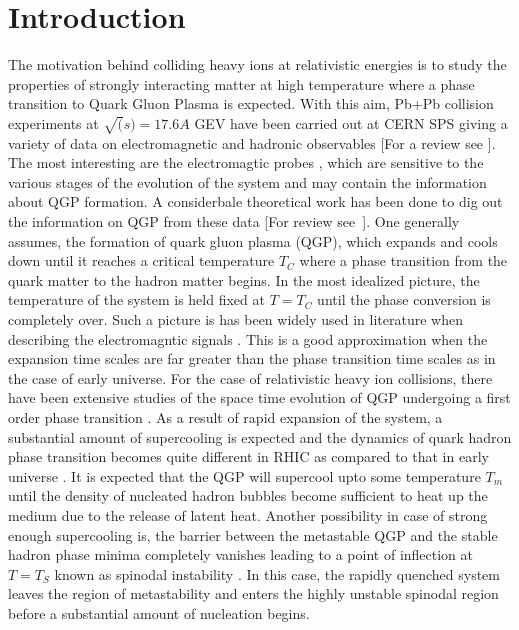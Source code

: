 \section{Introduction} \label{Introduction}
   The motivation behind colliding heavy ions at relativistic
energies is to study the properties of strongly interacting matter at
high temperature where a phase transition to Quark Gluon Plasma is 
expected. With this aim, Pb+Pb collision experiments at
$\sqrt(s)=17.6A$ GEV have been carried out at CERN SPS giving a 
variety of data on electromagnetic and hadronic observables
[For a review see \cite{ESKOLA}]. 
   The most interesting are the electromagtic
probes \cite{WA98_2000,CERES}, which are sensitive to the various stages 
of the evolution of the system and may contain the information about
QGP formation. A considerbale theoretical work has been done 
to dig out the information on QGP from these 
data [For review see~\cite{GALER,PEITZ}].
   One generally assumes, the formation of quark gluon plasma (QGP),
which expands and cools down until it reaches a critical temperature $T_C$ 
where a phase transition from the quark matter to the hadron matter begins.
  In the most idealized picture, the temperature of the system is held
fixed at $T=T_C$ until the phase conversion is completely over. 
Such a picture is has been widely used in literature when describing
the electromagntic signals \cite{}.
  This is a good approximation when the expansion time scales are far 
greater than the phase transition time scales as in the case of early 
universe. For the case of relativistic heavy ion collisions, there have
been extensive studies of the space time evolution of 
QGP undergoing a first order phase transition
\cite{CSER,ZABPRC,SHUK,INHOMO}.
  As a result of rapid expansion of the system, a substantial amount of 
supercooling is expected and the dynamics of quark hadron phase 
transition becomes quite different in RHIC as compared to that 
in early universe \cite{INHOMO,AKM}. 
  It is expected that the QGP will supercool upto some temperature $T_m$ 
until the density of nucleated hadron
bubbles become sufficient to heat up the medium due to the release of latent
heat. Another possibility in case of strong enough supercooling is, 
the barrier between the metastable QGP and the stable hadron phase minima 
completely vanishes leading to a point of inflection at $T=T_S$ known as 
spinodal instability \cite{SPINO}. In this case, the rapidly quenched system 
leaves the region of metastability and enters the highly unstable spinodal 
region before a substantial amount of nucleation begins.
